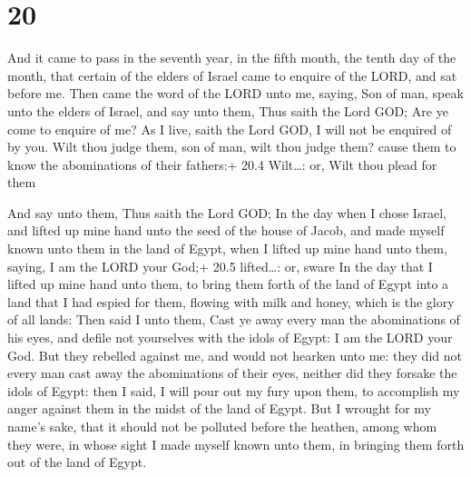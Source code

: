 \hypertarget{section-19}{%
\section{20}\label{section-19}}

 And it came to pass in the seventh year, in the fifth
month, the tenth day of the month, that certain of the elders of Israel
came to enquire of the LORD, and sat before me.  Then came
the word of the LORD unto me, saying,  Son of man, speak
unto the elders of Israel, and say unto them, Thus saith the Lord GOD;
Are ye come to enquire of me? As I live, saith the Lord GOD, I will not
be enquired of by you.  Wilt thou judge them, son of man,
wilt thou judge them? cause them to know the abominations of their
fathers:+ 20.4 Wilt\ldots: or, Wilt thou plead for them

 And say unto them, Thus saith the Lord GOD; In the day
when I chose Israel, and lifted up mine hand unto the seed of the house
of Jacob, and made myself known unto them in the land of Egypt, when I
lifted up mine hand unto them, saying, I am the LORD your God;+ 20.5
lifted\ldots: or, sware  In the day that I lifted up mine
hand unto them, to bring them forth of the land of Egypt into a land
that I had espied for them, flowing with milk and honey, which is the
glory of all lands:  Then said I unto them, Cast ye away
every man the abominations of his eyes, and defile not yourselves with
the idols of Egypt: I am the LORD your God.  But they
rebelled against me, and would not hearken unto me: they did not every
man cast away the abominations of their eyes, neither did they forsake
the idols of Egypt: then I said, I will pour out my fury upon them, to
accomplish my anger against them in the midst of the land of Egypt.
 But I wrought for my name's sake, that it should not be
polluted before the heathen, among whom they were, in whose sight I made
myself known unto them, in bringing them forth out of the land of Egypt.

